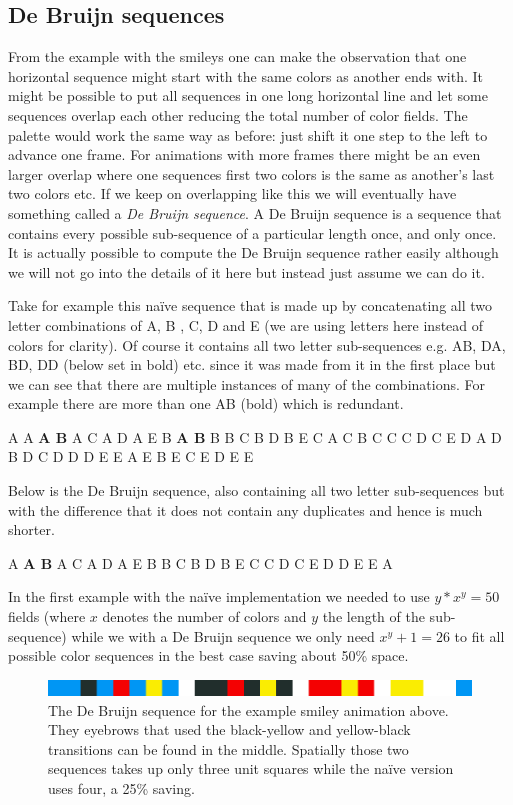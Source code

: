 \documentclass{article}
\begin{document}
\subsection{De Bruijn sequences}

From the example with the smileys one can make the observation that one
horizontal sequence might start with the same colors as another ends
with. It might be possible to put all sequences in one long horizontal
line and let some sequences overlap each other reducing the total number
of color fields. The palette would work the same way as before: just
shift it one step to the left to advance one frame. For animations with
more frames there might be an even larger overlap where one sequences
first two colors is the same as another's last two colors etc. If we
keep on overlapping like this we will eventually have something called a \emph{De
Bruijn sequence}. A De Bruijn sequence is a sequence that contains every
possible sub-sequence of a particular length once, and only once. \\
It is actually possible to compute the De Bruijn sequence rather easily
although we will not go into the details of it here but instead just
assume we can do it.

Take for example this naïve sequence that is made up by concatenating all two
letter combinations of A, B , C, D and E (we are using letters here
instead of colors for clarity). Of course it contains all two letter
sub-sequences e.g. AB, DA, BD, DD (below set in bold) etc. since it was
made from it in the first place but we can see that there are multiple
instances of many of the combinations. For example there are more than
one AB (bold) which is redundant.

A A \textbf{A B} A C A D A E B \textbf{A B} B B C B D B E C A C B C C C
D C E D A D B D C D D D E E A E B E C E D E E

Below is the De Bruijn sequence, also containing all two letter
sub-sequences but with the difference that it does not contain any
duplicates and hence is much shorter.

A \textbf{A B} A C A D A E B B C B D B E C C D C E D D E E A

In the first example with the naïve implementation we needed to use
\(y*x^y = 50\) fields (where \(x\) denotes the number of colors and
\(y\) the length of the sub-sequence) while we with a De Bruijn sequence
we only need \(x^y + 1 = 26\) to fit all possible color sequences in the
best case saving about 50\% space.

\begin{figure}[ht!]
\centering
\includegraphics[width=\textwidth]{images/two-image-debruijn-sequence.png}
\caption{The De Bruijn sequence for the example smiley animation above. They eyebrows that used the black-yellow and yellow-black transitions can be found in the middle. Spatially those two sequences takes up only three unit squares while the naïve version uses four, a 25\% saving.}
\end{figure}
\end{document}
